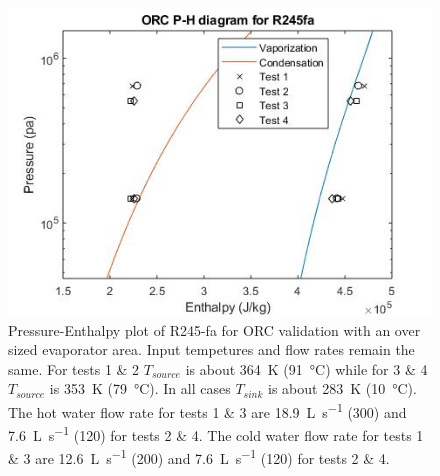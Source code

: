 \begin{figure}[p]
	\centering

	\includegraphics[width=\textwidth]{figures/VerificationPH02}
	\caption{Pressure-Enthalpy plot of R245-fa for ORC validation with an over sized evaporator area. Input tempetures and flow rates remain the same. 
	For tests 1 \& 2 $T_{source}$ is about \SI{364}{\kelvin} (\SI{91}{\degreeCelsius})
	while for 3 \& 4 $T_{source}$ is \SI{353}{\kelvin} (\SI{79}{\degreeCelsius}). 
	In all cases $T_{sink}$ is about \SI{283}{\kelvin} (\SI{10}{\degreeCelsius}). 
	The hot water flow rate for tests 1 \& 3 are \SI{18.9}{\liter\per\second} (\SI{300}{\gpm})
	and	\SI{7.6}{\liter\per\second} (\SI{120}{\gpm}) for tests 2 \& 4. 
	The cold water flow rate for tests 1 \& 3 are \SI{12.6}{\liter\per\second} (\SI{200}{\gpm})
	and \SI{7.6}{\liter\per\second} (\SI{120}{\gpm}) for tests 2 \& 4.}
	\label{fig:verifcation_ph02}
\end{figure}